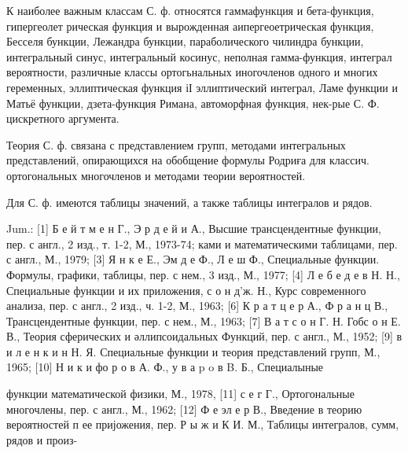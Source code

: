 \documentclass[10pt]{article}
\begin{document}
К наиболее важным классам С. ф. относятся гаммафункция и бета-функция, гипергеолет рическая функция и вырожденная аипергеоетрическая функция, Бесселя бункции, Лежандра бункции, параболического чилиндра бункции, интегральный синус, интегральный косинус, неполная гамма-функция, интеграл вероятности, различные классы ортогьнальных иногочленов одного и многих геременных, эллиптическая функция іІ эллиптический интеграл, Ламе функции и Матьё функции, дзета-функция Римана, автоморфная функция, нек-рые С. Ф. цискретного аргумента.



Теория С. ф. связана с представлением групп, методами интегральных представлений, опирающихся на обобщение формулы Родриға для классич. ортогональных многочленов и методами теории вероятностей.



Для С. ф. имеются таблицы значений, а также таблицы интегралов и рядов.



Jum.: [1] Б е й т м е н Г., Э р д е й и А., Высшие трансцендентные функции, пер. с англ., 2 изд., т. 1-2, М., 1973-74; ками и математическими таблицами, пер. с англ., М., 1979; [3] Я н к е Е., Эм д е Ф., Л е ш Ф., Специальные функции. Формулы, графики, таблицы, пер. с нем., 3 изд., М., 1977; [4] Л е б е д е в Н. Н., Специальные функции и их приложения, с о н д'ж. Н., Курс современного анализа, пер. с англ., 2 изд., ч. 1-2, М., 1963; [6] К р а т ц е р А., Ф р а н ц В., Трансцендентные функции, пер. с нем., М., 1963; [7] В а т с о н Г. Н. Гобс о н Е. В., Теория сферических и әллипсоидальных Функций, пер. с англ., М., 1952; [9] в и л е н к и н Н. Я. Специальные функции и теория представлений групп, М., 1965; [10] Н и к и фо р о в А. Ф., у в а p o в B. Б., Специалыные

функции математической физики, М., 1978, [11] с е г Г., Ортогональные многочлены, пер. с англ., М., 1962; [12] Ф е эл е р В., Введение в теорию вероятностей п ее пријожения, пер. Р ы ж и К И. М., Таблицы интегралов, сумм, рядов и произ-
\end{document}
